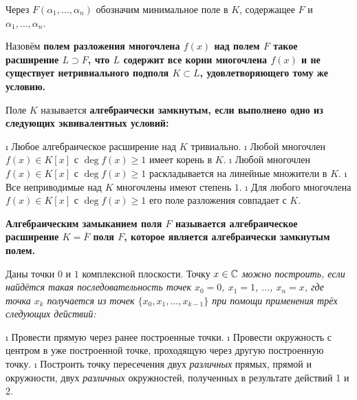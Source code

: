 \begin{defn}
Через \(F(\alpha_1,\ldots,\alpha_n)\) обозначим минимальное поле в \(K\), содержащее \(F\) и \(\alpha_1,\ldots,\alpha_n\).
\end{defn}

\begin{defn}
Назовём \bf{полем разложения} многочлена \(f(x)\) над полем \(F\) такое расширение \(L \supset F\), что \(L\) содержит все корни многочлена \(f(x)\) и не существует нетривиального подполя \(K \subset L\), удовлетворяющего тому же условию.
\end{defn}

\begin{defn}
Поле \(K\) называется \bf{алгебраически замкнутым}, если выполнено одно из следующих эквивалентных условий:

\begin{enumerate}
\def\labelenumi{(\arabic{enumi})}
\tightlist
\i
  Любое алгебраическое расширение над \(K\) тривиально.
\i
  Любой многочлен \(f(x) \in K[x]\) с \(\deg f(x) \geq 1\) имеет корень в \(K\).
\i
  Любой многочлен \(f(x) \in K[x]\) с \(\deg f(x) \geq 1\) раскладывается на линейные множители в \(K\).
\i
  Все неприводимые над \(K\) многочлены имеют степень \(1\).
\i
  Для любого многочлена \(f(x) \in K[x]\) с \(\deg f(x) \geq 1\) его поле разложения совпадает с \(K\).
\end{enumerate}

\end{defn}

\begin{defn}
\bf{Алгебраическим замыканием} поля \(F\) называется алгебраическое расширение \(K=\overline{F}\) поля \(F\), которое является алгебраически замкнутым полем.

\end{defn}

\begin{defn}
Даны точки \(0\) и \(1\) комплексной плоскости. Точку \(x \in \mathbb{C}\) \it{можно построить}, если найдётся такая последовательность точек \(x_0=0\), \(x_1=1\), \(\ldots\), \(x_n=x\), где точка \(x_k\) получается из точек \(\{x_0,x_1,\ldots, x_{k-1}\}\) при помощи применения трёх следующих действий:

\begin{enumerate}
\def\labelenumi{\arabic{enumi}.}
\tightlist
\i
  Провести прямую через ранее построенные точки.
\i
  Провести окружность с центром в уже построенной точке, проходящую через другую построенную точку.
\i
  Построить точку пересечения двух \emph{различных} прямых, прямой и окружности, двух \emph{различных} окружностей, полученных в результате действий 1 и 2.
\end{enumerate}

\end{defn}

